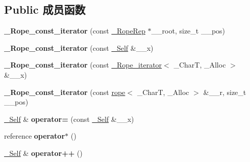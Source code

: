 \subsection*{Public 成员函数}
\begin{DoxyCompactItemize}
\item 
\mbox{\label{class___rope__const__iterator_a9e9a2a8c682e3ca25ec4bc868d2c4dcb}} 
{\bfseries \+\_\+\+Rope\+\_\+const\+\_\+iterator} (const \hyperlink{struct___rope___rope_rep}{\+\_\+\+Rope\+Rep} $\ast$\+\_\+\+\_\+root, size\+\_\+t \+\_\+\+\_\+pos)
\item 
\mbox{\label{class___rope__const__iterator_a3777f1d54e4ccd38c412b6ad8c677db1}} 
{\bfseries \+\_\+\+Rope\+\_\+const\+\_\+iterator} (const \hyperlink{class___rope__iterator__base}{\+\_\+\+Self} \&\+\_\+\+\_\+x)
\item 
\mbox{\label{class___rope__const__iterator_a4e16b872ad568b2b0fc358f91fc689da}} 
{\bfseries \+\_\+\+Rope\+\_\+const\+\_\+iterator} (const \hyperlink{class___rope__iterator}{\+\_\+\+Rope\+\_\+iterator}$<$ \+\_\+\+CharT, \+\_\+\+Alloc $>$ \&\+\_\+\+\_\+x)
\item 
\mbox{\label{class___rope__const__iterator_a3973f9bda36cb74bced3a3f7dd488023}} 
{\bfseries \+\_\+\+Rope\+\_\+const\+\_\+iterator} (const \hyperlink{classrope}{rope}$<$ \+\_\+\+CharT, \+\_\+\+Alloc $>$ \&\+\_\+\+\_\+r, size\+\_\+t \+\_\+\+\_\+pos)
\item 
\mbox{\label{class___rope__const__iterator_a941bbe58084b295595eab6ccd2a549c2}} 
\hyperlink{class___rope__iterator__base}{\+\_\+\+Self} \& {\bfseries operator=} (const \hyperlink{class___rope__iterator__base}{\+\_\+\+Self} \&\+\_\+\+\_\+x)
\item 
\mbox{\label{class___rope__const__iterator_a2e15abd540683cdab146012a70ffb9a4}} 
reference {\bfseries operator$\ast$} ()
\item 
\mbox{\label{class___rope__const__iterator_a364ea5a96230bd9ebb18e2c120ee06f0}} 
\hyperlink{class___rope__iterator__base}{\+\_\+\+Self} \& {\bfseries operator++} ()

\end{DoxyCompactItemize}

